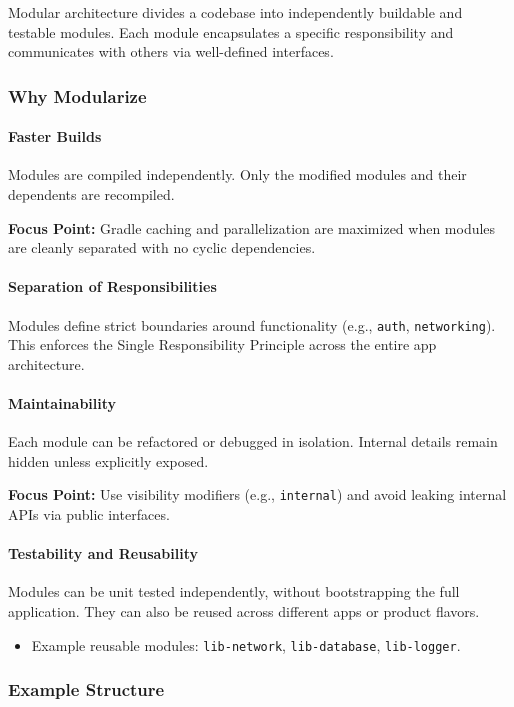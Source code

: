 \documentclass[a4paper,12pt]{article}
\begin{document}
Modular architecture divides a codebase into independently buildable and testable modules. Each module encapsulates a specific responsibility and communicates with others via well-defined interfaces.

\subsubsection{Why Modularize}

\paragraph{Faster Builds}
Modules are compiled independently. Only the modified modules and their dependents are recompiled.

\textbf{Focus Point:} Gradle caching and parallelization are maximized when modules are cleanly separated with no cyclic dependencies.

\paragraph{Separation of Responsibilities}
Modules define strict boundaries around functionality (e.g., \texttt{auth}, \texttt{networking}). This enforces the Single Responsibility Principle across the entire app architecture.

\paragraph{Maintainability}
Each module can be refactored or debugged in isolation. Internal details remain hidden unless explicitly exposed.

\textbf{Focus Point:} Use visibility modifiers (e.g., \texttt{internal}) and avoid leaking internal APIs via public interfaces.

\paragraph{Testability and Reusability}
Modules can be unit tested independently, without bootstrapping the full application. They can also be reused across different apps or product flavors.

\begin{itemize}
  \item Example reusable modules: \texttt{lib-network}, \texttt{lib-database}, \texttt{lib-logger}.
\end{itemize}

\subsubsection{Example Structure}
\end{document}
